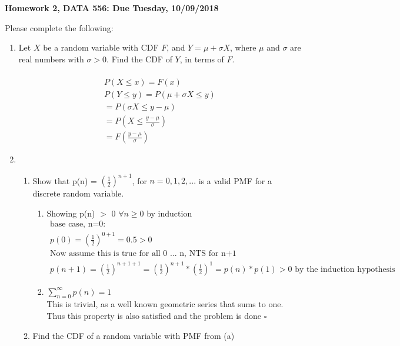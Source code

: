\documentclass[11pt]{article}
\begin{document}
\begin{title}
	{\Large\bf Homework 2, DATA 556: Due Tuesday, 10/09/2018}
\end{title}

\author{\bf Alexander Van Roijen}

\maketitle

\newpage
Please complete the following:
\begin{enumerate}
\item  Let $X$ be a random variable with CDF $F$, and $Y = \mu+\sigma X$, where $\mu$ and $\sigma$ are real numbers with $\sigma > 0$. Find the CDF of $Y$, in terms of $F$.
\\
\\
\begin{gather}
	P(X\leq x) = F(x)\\
	P(Y\leq y) = P(\mu + \sigma X \leq y) \\
	= P(\sigma X \leq y - \mu) \\
	= P(X \leq \frac{y-\mu}{\sigma})\\
	= F(\frac{y-\mu}{\sigma})
\end{gather}	
\item
\begin{enumerate}
	\item  Show that p(n) = $(\frac{1}{2})^{n+1}$, for $n = 0, 1, 2, . . .$ is a valid PMF for a discrete random variable.
	\begin{enumerate}
		\item Showing p(n) $>$ 0 $\forall n \ge 0$ by induction 	
		\begin{gather}
				\text{base case, n=0:}\\
				p(0) = (\frac{1}{2}) ^ {0+1} = 0.5 > 0 \\
				\text{Now assume this is true for all 0 ... n, NTS for n+1}\\
				p(n+1) = (\frac{1}{2}) ^ {n+1+1} = (\frac{1}{2}) ^ {n+1} * (\frac{1}{2}) ^ {1} = p(n) * p(1) > 0 \text{ by the induction hypothesis} 
		\end{gather}
		\item $\sum_{n=0}^{\infty} p(n) = 1$\\
		This is trivial, as a well known geometric series that sums to one. Thus this property is also satisfied and the problem is done $\square$	
	\end{enumerate}
	\item Find the CDF of a random variable with PMF from (a)

\end{enumerate}
\end{enumerate}
\end{document}
